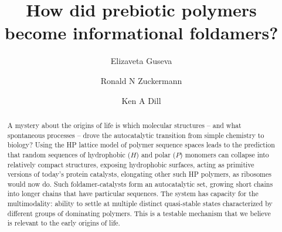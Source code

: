 \documentclass[twocolumn,letterpaper]{revtex4}
\begin{document}
\title{How did prebiotic polymers become informational foldamers?}

\author{Elizaveta Guseva}

%  
\author{Ronald N Zuckermann}
\author{Ken A Dill}





% 
\begin{abstract}
A mystery about the origins of life is which molecular structures -- and what spontaneous 
processes -- drove the autocatalytic transition from simple chemistry to biology?  Using the HP 
lattice model of polymer sequence spaces leads to the prediction that random sequences of 
hydrophobic ($H$) and 
polar ($P$) monomers can collapse into relatively compact structures, exposing hydrophobic 
surfaces, acting as primitive versions of today's protein catalysts, elongating other such HP 
polymers, as ribosomes would now do. Such foldamer-catalysts form an autocatalytic set, growing 
short chains into longer chains that have particular sequences. The system has capacity for the 
multimodality: ability to settle at multiple distinct 
quasi-stable states characterized by different groups of dominating polymers. This is a testable 
mechanism that we believe is relevant to the early origins of life.
\end{abstract}
% 
\maketitle
\end{document}
